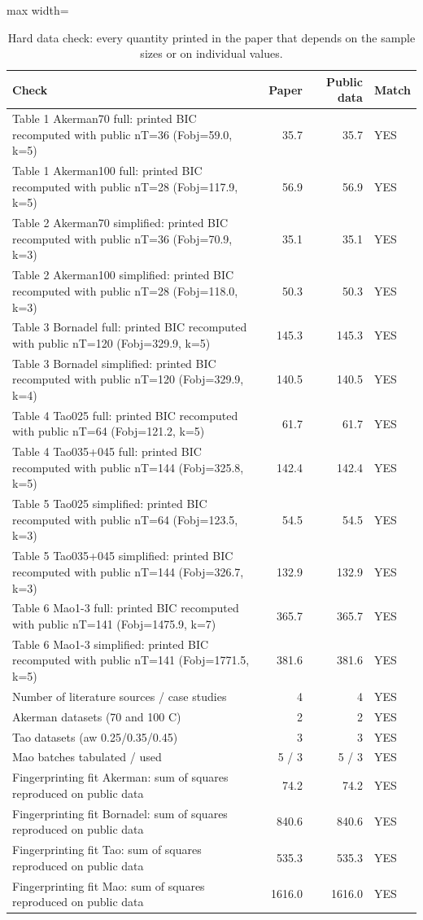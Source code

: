 \begin{table}[t]
\centering
\caption{Hard data check: every quantity printed in the paper that depends on the sample sizes or on individual values.}\label{tab:datacheck}
\scriptsize
\begin{adjustbox}{max width=\linewidth}
\begin{tabular}{p{9.2cm}rrl}
\toprule
Check & Paper & Public data & Match \\
\midrule
Table 1 Akerman70 full: printed BIC recomputed with public nT=36 (Fobj=59.0, k=5) & 35.7 & 35.7 & YES \\
Table 1 Akerman100 full: printed BIC recomputed with public nT=28 (Fobj=117.9, k=5) & 56.9 & 56.9 & YES \\
Table 2 Akerman70 simplified: printed BIC recomputed with public nT=36 (Fobj=70.9, k=3) & 35.1 & 35.1 & YES \\
Table 2 Akerman100 simplified: printed BIC recomputed with public nT=28 (Fobj=118.0, k=3) & 50.3 & 50.3 & YES \\
Table 3 Bornadel full: printed BIC recomputed with public nT=120 (Fobj=329.9, k=5) & 145.3 & 145.3 & YES \\
Table 3 Bornadel simplified: printed BIC recomputed with public nT=120 (Fobj=329.9, k=4) & 140.5 & 140.5 & YES \\
Table 4 Tao025 full: printed BIC recomputed with public nT=64 (Fobj=121.2, k=5) & 61.7 & 61.7 & YES \\
Table 4 Tao035+045 full: printed BIC recomputed with public nT=144 (Fobj=325.8, k=5) & 142.4 & 142.4 & YES \\
Table 5 Tao025 simplified: printed BIC recomputed with public nT=64 (Fobj=123.5, k=3) & 54.5 & 54.5 & YES \\
Table 5 Tao035+045 simplified: printed BIC recomputed with public nT=144 (Fobj=326.7, k=3) & 132.9 & 132.9 & YES \\
Table 6 Mao1-3 full: printed BIC recomputed with public nT=141 (Fobj=1475.9, k=7) & 365.7 & 365.7 & YES \\
Table 6 Mao1-3 simplified: printed BIC recomputed with public nT=141 (Fobj=1771.5, k=5) & 381.6 & 381.6 & YES \\
Number of literature sources / case studies & 4 & 4 & YES \\
Akerman datasets (70 and 100 C) & 2 & 2 & YES \\
Tao datasets (aw 0.25/0.35/0.45) & 3 & 3 & YES \\
Mao batches tabulated / used & 5 / 3 & 5 / 3 & YES \\
Fingerprinting fit Akerman: sum of squares reproduced on public data & 74.2 & 74.2 & YES \\
Fingerprinting fit Bornadel: sum of squares reproduced on public data & 840.6 & 840.6 & YES \\
Fingerprinting fit Tao: sum of squares reproduced on public data & 535.3 & 535.3 & YES \\
Fingerprinting fit Mao: sum of squares reproduced on public data & 1616.0 & 1616.0 & YES \\
\bottomrule
\end{tabular}
\end{adjustbox}
\end{table}
